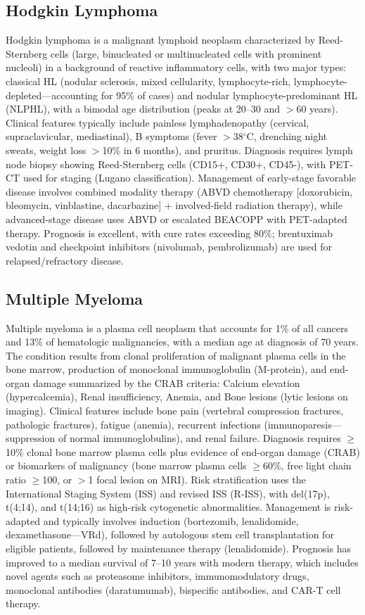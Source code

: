 \subsection{Hodgkin Lymphoma}
\label{sec:Hodgkin Lymphoma}
Hodgkin lymphoma is a malignant lymphoid neoplasm characterized by Reed-Sternberg cells (large, binucleated or multinucleated cells with prominent nucleoli) in a background of reactive inflammatory cells, with two major types: classical HL (nodular sclerosis, mixed cellularity, lymphocyte-rich, lymphocyte-depleted---accounting for 95\% of cases) and nodular lymphocyte-predominant HL (NLPHL), with a bimodal age distribution (peaks at 20--30 and $>$60 years). Clinical features typically include painless lymphadenopathy (cervical, supraclavicular, mediastinal), B symptoms (fever $>$38$^\circ$C, drenching night sweats, weight loss $>$10\% in 6 months), and pruritus. Diagnosis requires lymph node biopsy showing Reed-Sternberg cells (CD15+, CD30+, CD45-), with PET-CT used for staging (Lugano classification). Management of early-stage favorable disease involves combined modality therapy (ABVD chemotherapy [doxorubicin, bleomycin, vinblastine, dacarbazine] + involved-field radiation therapy), while advanced-stage disease uses ABVD or escalated BEACOPP with PET-adapted therapy. Prognosis is excellent, with cure rates exceeding 80\%; brentuximab vedotin and checkpoint inhibitors (nivolumab, pembrolizumab) are used for relapsed/refractory disease.

\subsection{Multiple Myeloma}
\label{sec:Multiple Myeloma}
Multiple myeloma is a plasma cell neoplasm that accounts for 1\% of all cancers and 13\% of hematologic malignancies, with a median age at diagnosis of 70 years. The condition results from clonal proliferation of malignant plasma cells in the bone marrow, production of monoclonal immunoglobulin (M-protein), and end-organ damage summarized by the CRAB criteria: Calcium elevation (hypercalcemia), Renal insufficiency, Anemia, and Bone lesions (lytic lesions on imaging). Clinical features include bone pain (vertebral compression fractures, pathologic fractures), fatigue (anemia), recurrent infections (immunoparesis---suppression of normal immunoglobulins), and renal failure. Diagnosis requires $\geq$10\% clonal bone marrow plasma cells plus evidence of end-organ damage (CRAB) or biomarkers of malignancy (bone marrow plasma cells $\geq$60\%, free light chain ratio $\geq$100, or $>$1 focal lesion on MRI). Risk stratification uses the International Staging System (ISS) and revised ISS (R-ISS), with del(17p), t(4;14), and t(14;16) as high-risk cytogenetic abnormalities. Management is risk-adapted and typically involves induction (bortezomib, lenalidomide, dexamethasone---VRd), followed by autologous stem cell transplantation for eligible patients, followed by maintenance therapy (lenalidomide). Prognosis has improved to a median survival of 7--10 years with modern therapy, which includes novel agents such as proteasome inhibitors, immunomodulatory drugs, monoclonal antibodies (daratumumab), bispecific antibodies, and CAR-T cell therapy.

